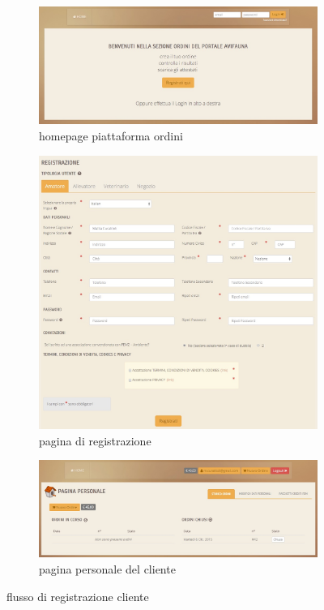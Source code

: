 \begin{figure}
 \centering
 \begin{subfigure}[b]{0.75\textwidth}
   \includegraphics[width=\textwidth]{images/cl-homepage-p}
   \caption{homepage piattaforma ordini}
   \label{fig:cl-homepage-p}
 \end{subfigure}
 \begin{subfigure}[b]{0.6\textwidth}
   \includegraphics[width=\textwidth]{images/cl-registrazione} 
   \caption{pagina di registrazione}
   \label{fig:cl-registrazione}
 \end{subfigure}
 \begin{subfigure}[b]{0.75\textwidth}
   \includegraphics[width=\textwidth]{images/cl-pagina-personale}
   \caption{pagina personale del cliente}
   \label{fig:cl-pagina-personale} 
 \end{subfigure}
 \caption{flusso di registrazione cliente}
\end{figure}

